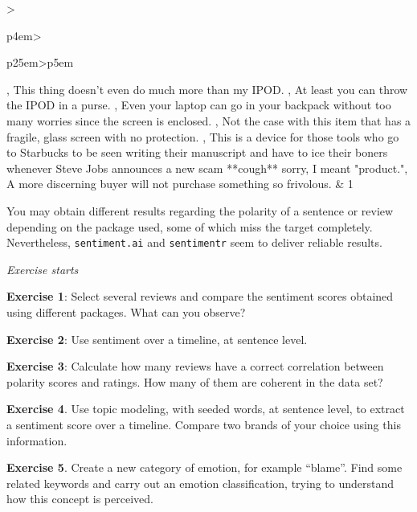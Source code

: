 \begin{longtable*}[t]{>{\raggedright\arraybackslash}p{4em}>{\raggedright\arraybackslash}p{25em}>{\raggedleft\arraybackslash}p{5em}}
                                                                                                                                    , This thing doesn't even do much more than my IPOD.                                                                                                                                                , At least you can throw the IPOD in a purse.                                                                                                                                                       , Even your laptop can go in your backpack without too many worries since the screen is enclosed.                                                                                                   , Not the case with this item that has a fragile, glass screen with no protection.                                                                                                                  , This is a device for those tools who go to Starbucks to be seen writing their manuscript and have to ice their boners whenever Steve Jobs announces a new scam **cough** sorry, I meant "product.", A more discerning buyer will not purchase something so frivolous. & 1\\
\bottomrule
\end{longtable*}

You may obtain different results regarding the polarity of a sentence
or review depending on the package used, some of which miss the
target completely. Nevertheless, \texttt{sentiment.ai} and
\texttt{sentimentr} seem to deliver reliable results.

\emph{Exercise starts}

\textbf{Exercise 1}: Select several reviews and compare the sentiment
scores obtained using different packages. What can you observe?

\textbf{Exercise 2}: Use sentiment over a timeline, at sentence level.

\textbf{Exercise 3}: Calculate how many reviews have a correct
correlation between polarity scores and ratings. How many of them are
coherent in the data set?

\textbf{Exercise 4}. Use topic modeling, with seeded words, at
sentence level, to extract a sentiment score over a timeline. Compare two
brands of your choice using this information.

\textbf{Exercise 5}. Create a new category of emotion, for example
``blame''. Find some related keywords and carry out an emotion
classification, trying to understand how this concept is perceived.

